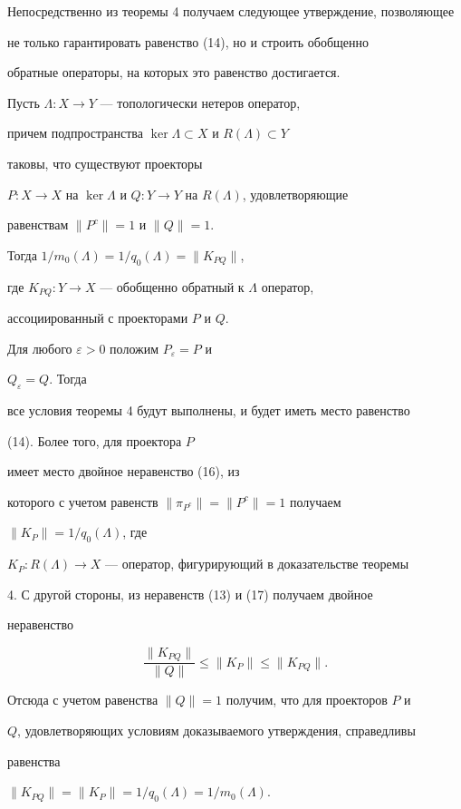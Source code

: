Непосредственно из теоремы 4 получаем следующее утверждение, позволяющее 


не только гарантировать равенство (14), но и строить обобщенно 


обратные операторы, на которых это равенство достигается. 


 


\begin{cor} Пусть $\Lambda:X\to Y$ --- топологически нетеров оператор,  


причем подпространства $\ker\Lambda\subset X$ и $R(\Lambda)\subset Y$ 


таковы, что существуют проекторы 


$P:X\to X$ на $\ker\Lambda$ и $Q:Y\to Y$ на $R(\Lambda)$, удовлетворяющие 


равенствам $\|P^c\|=1$ и $\|Q\|=1$. 


Тогда $1/m_0(\Lambda)=1/q_0(\Lambda)=\|K_{PQ}\|$, 


где $K_{PQ}:Y\to X$ --- обобщенно обратный к $\Lambda$ оператор, 


ассоциированный с проекторами $P$ и $Q$. 


\end{cor} 


 


\begin{pf} Для любого $\varepsilon>0$ положим $P_\varepsilon=P$ и 


$Q_\varepsilon=Q$. Тогда  


все условия теоремы 4 будут выполнены, и будет иметь место равенство  


(14). Более того, для проектора $P$ 


имеет место двойное неравенство (16), из 


которого с учетом равенств $\|\pi_{P^c}\|=\|P^c\|=1$ получаем 


$\|K_P\|=1/q_0(\Lambda)$, где 


$K_P:R(\Lambda)\to X$ --- оператор, фигурирующий в доказательстве теоремы 


4. С другой стороны, из неравенств (13) и (17) получаем двойное 


неравенство 


$$ 


\frac{\|K_{PQ}\|}{\|Q\|}\le\|K_P\|\le\|K_{PQ}\|. 


$$ 


Отсюда с учетом равенства $\|Q\|=1$ получим, что для проекторов $P$ и  


$Q$, удовлетворяющих условиям доказываемого утверждения, справедливы 


равенства 


$\|K_{PQ}\|=\|K_P\|=1/q_0(\Lambda)=1/m_0(\Lambda)$. 


\end{pf} 


